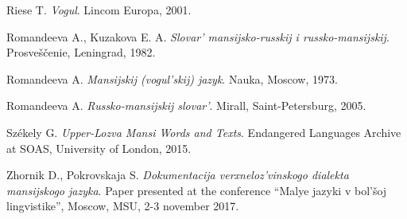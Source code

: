 \documentclass[b5paper,notitlepage]{article}
\begin{document}
\begin{thebibliography}{9}
Riese T. 
\textit{Vogul}.
Lincom Europa, 2001.

Romandeeva A., Kuzakova E. A. 
\textit{Slovar’ mansijsko-russkij i russko-mansijskij}.
Prosveščenie, Leningrad, 1982.

Romandeeva A.
\textit{Mansijskij (vogul’skij) jazyk}.
Nauka, Moscow, 1973.

Romandeeva A.
\textit{Russko-mansijskij slovar’}.
Mirall, Saint-Petersburg, 2005.

Székely G.
\textit{Upper-Lozva Mansi Words and Texts}.
Endangered Languages Archive at SOAS, University of London, 2015.

Zhornik D., Pokrovskaja S. 
\textit{Dokumentacija verxneloz’vinskogo dialekta mansijskogo jazyka}.
Paper presented at the conference “Malye jazyki v bol’šoj lingvistike”, Moscow, MSU, 2-3 november 2017.

\end{thebibliography}
\end{document}
